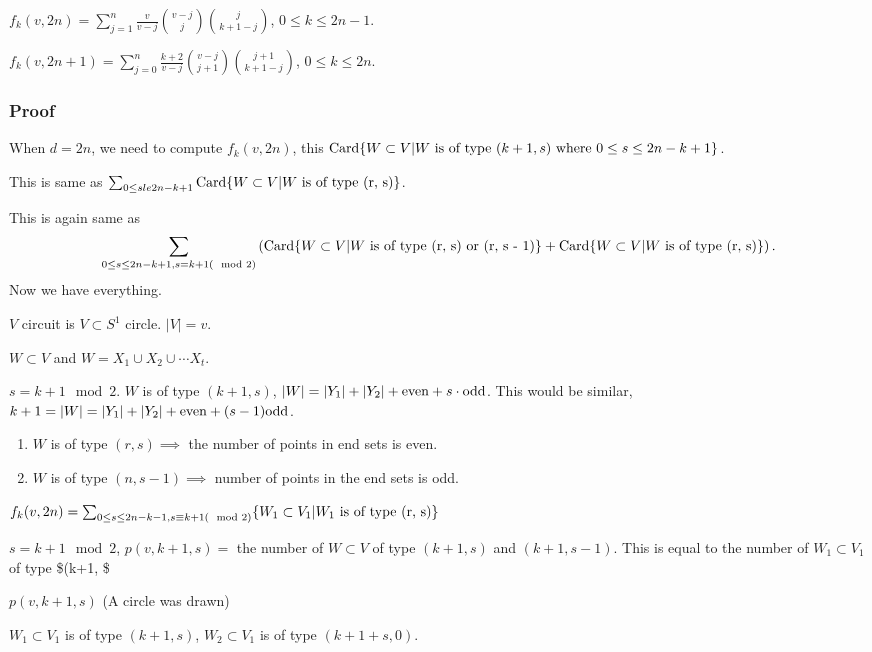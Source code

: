 \documentclass[11pt]{article}
\def\card{\operatorname{Card}}
\begin{document}
{{\(f_k(v, 2n) = \sum_{j = 1}^{n} \frac{v}{v-j}\binom{v-j}{j} \binom{j}{k+1 -
   j}\), \(0\le k \le 2n - 1\).

\(f_k(v, 2n+1) = \sum_{j = 0}^{n} \frac{k+2}{v-j} \binom{v-j}{j+1}
   \binom{j+1}{k+1 - j}\), \(0 \le k \le 2n\).
\subsubsection{Proof}
\label{sec:org4efca63}
When \(d = 2n\), we need to compute \(f_k(v, 2n)\), this \(\card \{ W \subset V
    \vert W \textup{ is of type } (k+1, s)\textup{ where } 0 \le s \le 2n - k +
    1 \}\).

This is same as \(\sum_{0 \le s le 2n - k + 1} \card \{W \subset V \vert W
    \textup{ is of type (r, s)}\}\).

This is again same as $$\sum_{0 \le s \le 2n - k + 1, s = k+1 (\mod 2)}
    \left( \card \{W \subset V \vert W \textup{ is of type (r, s) or (r, s -
    1)}\} + \card \{W \subset V \vert W \textup{ is of type (r, s)}\} \right).$$
Now we have everything.

\(V\) circuit is \(V \subset S^1\) circle. \(\vert V \vert = v\).

\(W \subset V\) and \(W = X_1 \cup X_2 \cup \cdots X_t\).

\(s = k+1 \mod 2\). \(W\) is of type \((k+1, s)\), \(\vert W \vert = \vert Y_1
    \vert + \vert Y_2 \vert + \textup{even} + s \cdot \textup{odd}\). This would
be similar, \(k + 1 = \vert W \vert = \vert Y_1 \vert + \vert Y_2 \vert +
    \textup{even} + (s-1) \textup{odd}\).

\begin{enumerate}
\item \(W\) is of type \((r, s) \implies\) the number of points in end sets is
even.
\item \(W\) is of type \((n, s-1) \implies\) number of points in the end sets is
odd.
\end{enumerate}

\(f_k(v, 2n) = \sum_{0 \le s \le 2n - k - 1, s \equiv k + 1 (\mod 2)} \{W_1
    \subset V_1 \vert W_1 \textup{ is of type (r, s)}\}\)

\(s = k+1 \mod 2\), \(p(v, k+1, s) =\) the number of \(W \subset V\) of type
\((k+1, s)\) and \((k+1, s-1)\). This is equal to the number of \(W_1 \subset
    V_1\) of type \$(k+1, \$

\(p(v, k+1, s)\) (A circle was drawn)

\(W_1 \subset V_1\) is of type \((k+1, s)\), \(W_2 \subset V_1\) is of type
\((k+1 + s, 0)\).

}}
\end{document}
